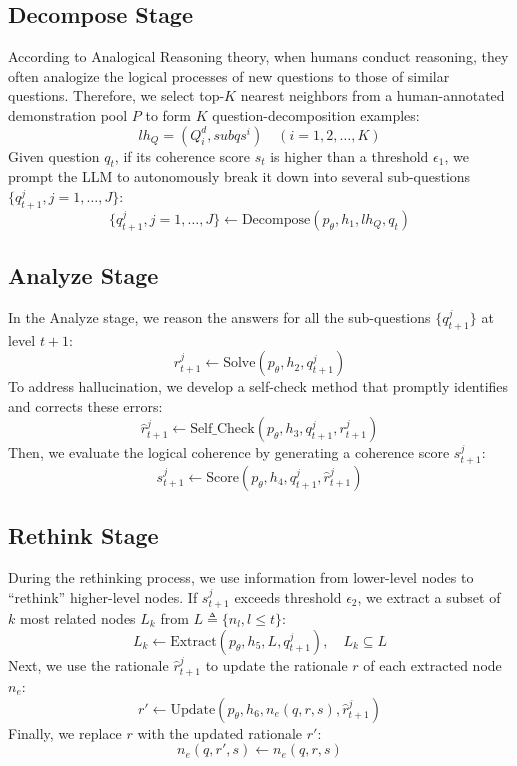 \documentclass{article}
\begin{document}
\subsection{Decompose Stage}
According to Analogical Reasoning theory, when humans conduct reasoning, they often analogize the logical processes of new questions to those of similar questions. Therefore, we select top-$K$ nearest neighbors from a human-annotated demonstration pool $P$ to form $K$ question-decomposition examples:
\begin{equation}
lh_Q = (Q_i^d, subqs^i) \quad (i=1,2,\dots,K)
\end{equation}
Given question $q_t$, if its coherence score $s_t$ is higher than a threshold $\epsilon_1$, we prompt the LLM to autonomously break it down into several sub-questions $\{q_{t+1}^j, j=1,\dots,J\}$:
\begin{equation}
\{q_{t+1}^j, j=1,\dots,J\} \leftarrow \text{Decompose}(p_\theta, h_1, lh_Q, q_t)
\end{equation}

\subsection{Analyze Stage}
In the Analyze stage, we reason the answers for all the sub-questions $\{q_{t+1}^j\}$ at level $t+1$:
\begin{equation}
r_{t+1}^j \leftarrow \text{Solve}(p_\theta, h_2, q_{t+1}^j)
\end{equation}
To address hallucination, we develop a self-check method that promptly identifies and corrects these errors:
\begin{equation}
\hat{r}_{t+1}^j \leftarrow \text{Self\_Check}(p_\theta, h_3, q_{t+1}^j, r_{t+1}^j)
\end{equation}
Then, we evaluate the logical coherence by generating a coherence score $s_{t+1}^j$:
\begin{equation}
s_{t+1}^j \leftarrow \text{Score}(p_\theta, h_4, q_{t+1}^j, \hat{r}_{t+1}^j)
\end{equation}

\subsection{Rethink Stage}
During the rethinking process, we use information from lower-level nodes to ``rethink'' higher-level nodes. If $s_{t+1}^j$ exceeds threshold $\epsilon_2$, we extract a subset of $k$ most related nodes $L_k$ from $L \triangleq \{n_l, l \le t\}$:
\begin{equation}
L_k \leftarrow \text{Extract}(p_\theta, h_5, L, q_{t+1}^j), \quad L_k \subseteq L
\end{equation}
Next, we use the rationale $\hat{r}_{t+1}^j$ to update the rationale $r$ of each extracted node $n_e$:
\begin{equation}
r' \leftarrow \text{Update}(p_\theta, h_6, n_e(q, r, s), \hat{r}_{t+1}^j)
\end{equation}
Finally, we replace $r$ with the updated rationale $r'$:
\begin{equation}
n_e(q, r', s) \leftarrow n_e(q, r, s)
\end{equation}
\end{document}
